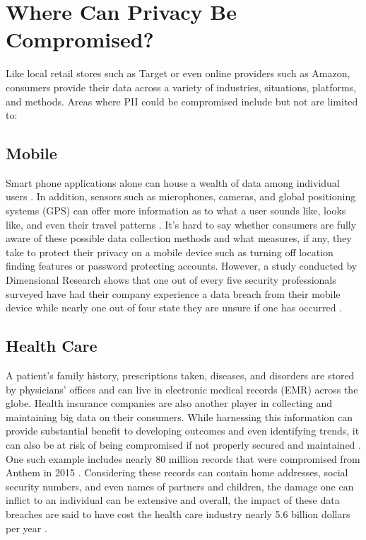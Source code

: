 \documentclass[sigconf]{acmart}
\begin{document}
\section{Where Can Privacy Be Compromised?}

Like local retail stores such as Target or even online providers such as Amazon, consumers provide their data across a variety of industries, situations, platforms, and methods. Areas where PII could be compromised include but not are limited to:

  \subsection{Mobile} 

Smart phone applications alone can house a wealth of data among individual users \cite{Tene2013}. In addition, sensors such as microphones, cameras, and global positioning systems (GPS) can offer more information as to what a user sounds like, looks like, and even their travel patterns \cite{Tene2013}. It's hard to say whether consumers are fully aware of these possible data collection methods and what measures, if any, they take to protect their privacy on a mobile device such as turning off location finding features or password protecting accounts. However, a study conducted by Dimensional Research shows that one out of every five security professionals surveyed have had their company experience a data breach from their mobile device while nearly one out of four state they are unsure if one has occurred \cite{Collett2017}. 

  \subsection{Health Care} 

A patient's family history, prescriptions taken, diseases, and disorders are stored by physicians' offices and can live in electronic medical records (EMR) across the globe. Health insurance companies are also another player in collecting and maintaining big data on their consumers. While harnessing this information can provide substantial benefit to developing outcomes and even identifying trends, it can also be at risk of being compromised if not properly secured and maintained \cite{Tene2013}. One such example includes nearly 80 million records that were compromised from Anthem in 2015 \cite{Akpan2016}. Considering these records can contain home addresses, social security numbers, and even names of partners and children, the damage one can inflict to an individual can be extensive and overall, the impact of these data breaches are said to have cost the health care industry nearly 5.6 billion dollars per year \cite{Akpan2016}.
\end{document}

